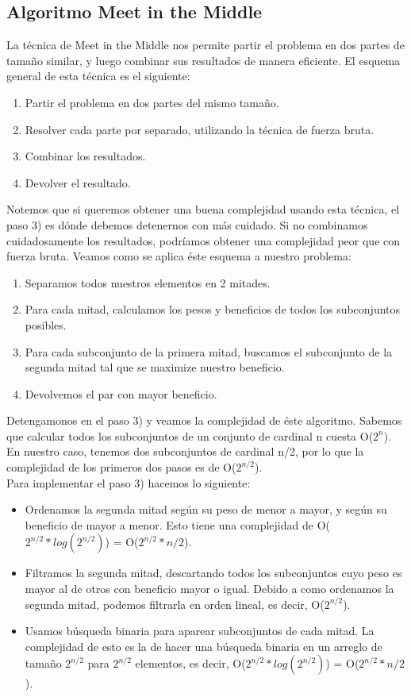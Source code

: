 \subsection{Algoritmo Meet in the Middle}

La técnica de Meet in the Middle nos permite partir el problema en dos partes de tamaño similar, y luego combinar sus resultados de manera eficiente.
El esquema general de esta técnica es el siguiente:

\begin{enumerate}
\item Partir el problema en dos partes del mismo tamaño.
\item Resolver cada parte por separado, utilizando la técnica de fuerza bruta.
\item Combinar los resultados.
\item Devolver el resultado.
\end{enumerate}

Notemos que si queremos obtener una buena complejidad usando esta técnica, el paso 3) es dónde debemos detenernos con más cuidado. Si no combinamos cuidadosamente los resultados, podríamos obtener una complejidad peor que con fuerza bruta.
Veamos como se aplica éste esquema a nuestro problema:

\begin{enumerate}
\item Separamos todos nuestros elementos en 2 mitades.
\item Para cada mitad, calculamos los pesos y beneficios de todos los subconjuntos posibles.
\item Para cada subconjunto de la primera mitad, buscamos el subconjunto de la segunda mitad tal que se maximize nuestro beneficio.
\item Devolvemos el par con mayor beneficio.
\end{enumerate}

Detengamonos en el paso 3) y veamos la complejidad de éste algoritmo. Sabemos que calcular todos los subconjuntos de un conjunto de cardinal n cuesta O($2^{n}$). En nuestro caso, tenemos dos subconjuntos de cardinal n/2, por lo que la complejidad de los primeros dos pasos es de O($2^{n/2}$). \\
Para implementar el paso 3) hacemos lo siguiente:
\begin{itemize}
\item Ordenamos la segunda mitad según su peso de menor a mayor, y según su beneficio de mayor a menor. Esto tiene una complejidad de O($2^{n/2} * log(2^{n/2})$) = O($2^{n/2} * n/2$).
\item Filtramos la segunda mitad, descartando todos los subconjuntos cuyo peso es mayor al de otros con beneficio mayor o igual. Debido a como ordenamos la segunda mitad, podemos filtrarla en orden lineal, es decir, O($2^{n/2}$).
\item Usamos búsqueda binaria para aparear subconjuntos de cada mitad. La complejidad de esto es la de hacer una búsqueda binaria en un arreglo de tamaño $2^{n/2}$ para $2^{n/2}$ elementos, es decir, O($2^{n/2} * log(2^{n/2})$) = O($2^{n/2} * n/2$).
\end{itemize}

